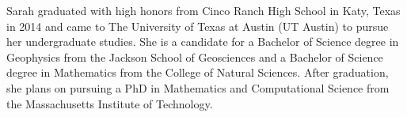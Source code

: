 Sarah graduated with high honors from Cinco Ranch High School in Katy, Texas in 2014 and came to The University of Texas at Austin (UT Austin) to pursue her undergraduate studies. 
She is a candidate for a Bachelor of Science degree in Geophysics from the Jackson School of Geosciences and a Bachelor of Science degree in Mathematics from the College of Natural Sciences.
After graduation, she plans on pursuing a PhD in Mathematics and Computational Science from the Massachusetts Institute of Technology.

